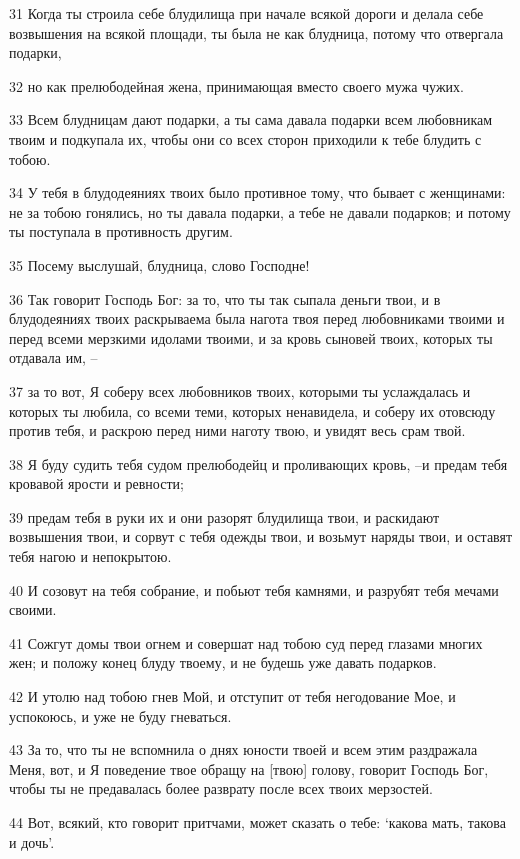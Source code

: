 \par 31 Когда ты строила себе блудилища при начале всякой дороги и делала себе возвышения на всякой площади, ты была не как блудница, потому что отвергала подарки,
\par 32 но как прелюбодейная жена, принимающая вместо своего мужа чужих.
\par 33 Всем блудницам дают подарки, а ты сама давала подарки всем любовникам твоим и подкупала их, чтобы они со всех сторон приходили к тебе блудить с тобою.
\par 34 У тебя в блудодеяниях твоих было противное тому, что бывает с женщинами: не за тобою гонялись, но ты давала подарки, а тебе не давали подарков; и потому ты поступала в противность другим.
\par 35 Посему выслушай, блудница, слово Господне!
\par 36 Так говорит Господь Бог: за то, что ты так сыпала деньги твои, и в блудодеяниях твоих раскрываема была нагота твоя перед любовниками твоими и перед всеми мерзкими идолами твоими, и за кровь сыновей твоих, которых ты отдавала им, --
\par 37 за то вот, Я соберу всех любовников твоих, которыми ты услаждалась и которых ты любила, со всеми теми, которых ненавидела, и соберу их отовсюду против тебя, и раскрою перед ними наготу твою, и увидят весь срам твой.
\par 38 Я буду судить тебя судом прелюбодейц и проливающих кровь, --и предам тебя кровавой ярости и ревности;
\par 39 предам тебя в руки их и они разорят блудилища твои, и раскидают возвышения твои, и сорвут с тебя одежды твои, и возьмут наряды твои, и оставят тебя нагою и непокрытою.
\par 40 И созовут на тебя собрание, и побьют тебя камнями, и разрубят тебя мечами своими.
\par 41 Сожгут домы твои огнем и совершат над тобою суд перед глазами многих жен; и положу конец блуду твоему, и не будешь уже давать подарков.
\par 42 И утолю над тобою гнев Мой, и отступит от тебя негодование Мое, и успокоюсь, и уже не буду гневаться.
\par 43 За то, что ты не вспомнила о днях юности твоей и всем этим раздражала Меня, вот, и Я поведение твое обращу на [твою] голову, говорит Господь Бог, чтобы ты не предавалась более разврату после всех твоих мерзостей.
\par 44 Вот, всякий, кто говорит притчами, может сказать о тебе: `какова мать, такова и дочь'.

